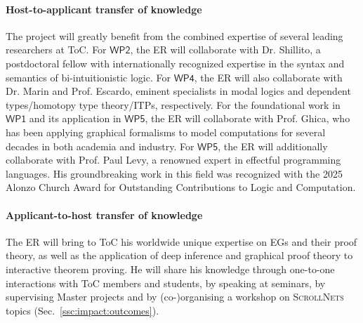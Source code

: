 \documentclass[12pt,draftproposal]{msca-pf}
\newcommand{\proj}{\small\textsc{ScrollNets}}
\newcommand{\WP}[1]{$\mathsf{WP#1}$}
\begin{document}
\paragraph{Host-to-applicant transfer of knowledge}
The project will greatly benefit from the combined expertise of several leading researchers at ToC.
For \WP{2}, the ER will collaborate with Dr. Shillito, a postdoctoral fellow with internationally
recognized expertise in the syntax and semantics of bi-intuitionistic logic. For \WP{4}, the ER will
also collaborate with Dr. Marin and Prof. Escardo, eminent specialists in modal logics and dependent
types/homotopy type theory/ITPs, respectively. For the foundational work in \WP{1} and its
application in \WP{5}, the ER will collaborate with Prof. Ghica, who has been applying graphical
formalisms to model computations for several decades in both academia and industry. For \WP{5}, the
ER will additionally collaborate with Prof. Paul Levy, a renowned expert in effectful programming
languages. His groundbreaking work in this field was recognized with the 2025 Alonzo Church Award
for Outstanding Contributions to Logic and Computation.

\paragraph{Applicant-to-host transfer of knowledge}
The ER will bring to ToC his worldwide unique expertise on EGs and their proof theory, as well as
the application of deep inference and graphical proof theory to interactive theorem proving. He will
share his knowledge through one-to-one interactions with ToC members and students, by speaking at
seminars, by supervising Master projects and by (co-)organising a workshop on {\proj} topics
(Sec.~\ref{ssc:impact:outcomes}).
\end{document}

